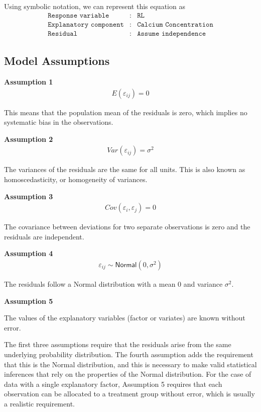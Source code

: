 \documentclass[a4paper, 10pt, fleqn, twosided]{memoir}
\begin{document}
Using symbolic notation, we can represent this equation as
\begin{eqnarray*}
	\texttt{Response variable}&:& \texttt{RL} \\
	\texttt{Explanatory component}&:& \texttt{Calcium Concentration}\\
	\texttt{Residual}&:& \texttt{Assume independence}
\end{eqnarray*}


\subsection{Model Assumptions}

\textbf{Assumption 1}
\begin{eqnarray*}
E(\varepsilon_{ij}) = 0
\end{eqnarray*}

This means that the population mean of the residuals is zero, which implies no systematic bias in the observations.

\textbf{Assumption 2}
\begin{eqnarray*}
Var(\varepsilon_{ij}) = \sigma^2
\end{eqnarray*}

The variances of the residuals are the same for all units. This is also known as homoscedasticity, or homogeneity of
variances.

\textbf{Assumption 3}
\begin{eqnarray*}
Cov(\varepsilon_{i},\varepsilon_{j}) = 0
\end{eqnarray*}

 The covariance between deviations for two separate observations is zero and the residuals are independent.

\textbf{Assumption 4}
\begin{eqnarray*}
\varepsilon_{ij} \sim \textsf{Normal}(0, \sigma^2)
\end{eqnarray*}

The residuals follow a Normal distribution with a mean 0 and variance $\sigma^2$.

\textbf{Assumption 5}

The values of the explanatory variables (factor or variates) are known without error.

The first three assumptions require that the residuals arise from the same
underlying probability distribution. The fourth assumption adds the requirement
that this is the Normal distribution, and this is necessary to make valid
statistical inferences that rely on the properties of the Normal distribution.
For the case of data with a single explanatory factor, Assumption 5 requires
that each observation can be allocated to a treatment group without error,
which is usually a realistic requirement.
\end{document}
